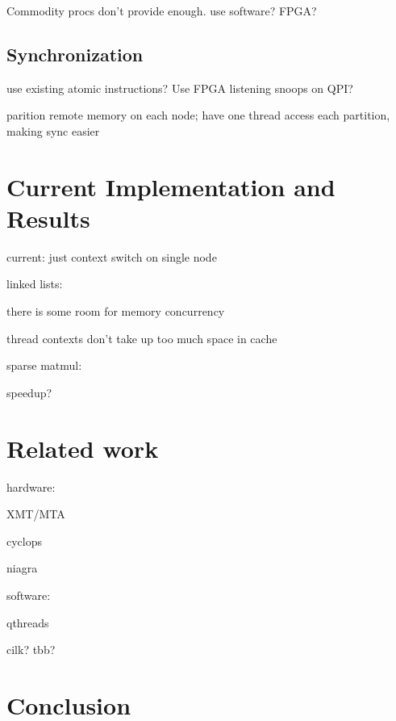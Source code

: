 \documentclass{acm_proc_article-sp}
\begin{document}
Commodity procs don't provide enough. use software? FPGA?

\subsection{Synchronization}

use existing atomic instructions? Use FPGA listening snoops on QPI?


parition remote memory on each node; have one thread access each
partition, making sync easier

\section{Current Implementation and Results}

current: just context switch on single node


linked lists:

there is some room for memory concurrency

thread contexts don't take up too much space in cache

sparse matmul:

speedup?






\section{Related work}


hardware:

XMT/MTA

cyclops

niagra

software:

qthreads

cilk? tbb?



\section{Conclusion}
\end{document}
